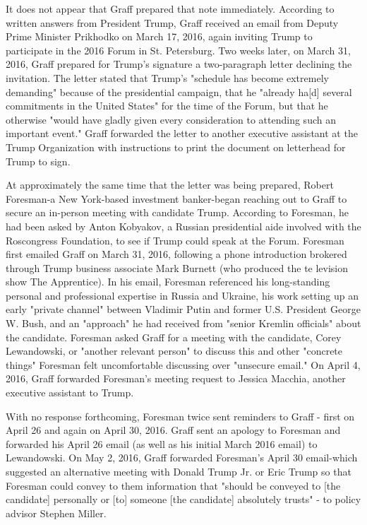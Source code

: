 It does not appear that Graff prepared that note immediately.
According to written answers from President Trump,%
Graff received an email from Deputy Prime Minister Prikhodko on March 17, 2016, again inviting Trump to participate in the 2016 Forum in St. Petersburg.%
Two weeks later, on March 31, 2016, Graff prepared for Trump's signature a two-paragraph letter declining the invitation.%
The letter stated that Trump's "schedule has become extremely demanding" because of the presidential campaign, that he "already ha[d] several commitments in the United States" for the time of the Forum, but that he otherwise "would have gladly given every consideration to attending such an important event."%
Graff forwarded the letter to another executive assistant at the Trump Organization with instructions to print the document on letterhead for Trump to sign.%

At approximately the same time that the letter was being prepared, Robert Foresman-a New York-based investment banker-began reaching out to Graff to secure an in-person meeting with candidate Trump.
According to Foresman, he had been asked by Anton Kobyakov, a Russian presidential aide involved with the Roscongress Foundation, to see if Trump could speak at the Forum.%
Foresman first emailed Graff on March 31, 2016, following a phone introduction brokered through Trump business associate Mark Burnett (who produced the te levision show The Apprentice).
In his email, Foresman referenced his long-standing personal and professional expertise in Russia and Ukraine, his work setting up an early "private channel" between Vladimir Putin and former U.S. President George W. Bush, and an "approach" he had received from "senior Kremlin officials" about the candidate.
Foresman asked Graff for a meeting with the candidate, Corey Lewandowski, or "another relevant person" to discuss this and other "concrete things" Foresman felt uncomfortable discussing over "unsecure email."%
On April 4, 2016, Graff forwarded Foresman's meeting request to Jessica Macchia, another executive assistant to Trump.%

With no response forthcoming, Foresman twice sent reminders to Graff - first on April 26 and again on April 30, 2016.%
Graff sent an apology to Foresman and forwarded his April 26 email (as well as his initial March 2016 email) to Lewandowski.%
On May 2, 2016, Graff forwarded Foresman's April 30 email-which suggested an alternative meeting with Donald Trump Jr. or Eric Trump so that Foresman could convey to them information that "should be conveyed to [the candidate] personally or [to] someone [the candidate] absolutely trusts" - to policy advisor Stephen Miller.%

